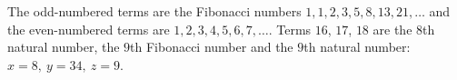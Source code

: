 The odd-numbered terms are the Fibonacci numbers $1,1,2,3,5,8,13,21,\dots$ and the even-numbered terms are $1,2,3,4,5,6,7,\dots$. Terms $16$, $17$, $18$ are the $8$th natural number, the $9$th Fibonacci number and the $9$th natural number: $\boxed{x=8,\ y=34,\ z=9}$.
